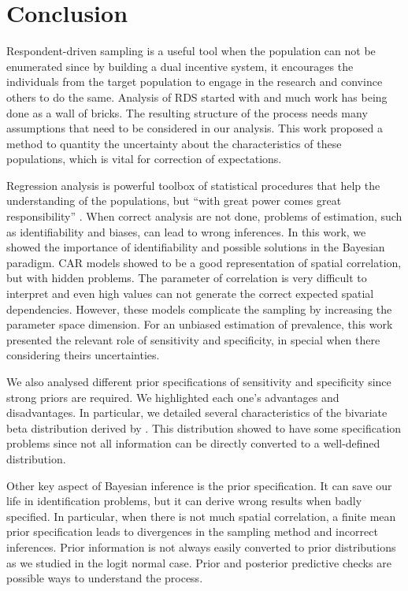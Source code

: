 \chapter{Conclusion}
\label{ch:conclusions}

Respondent-driven sampling is a useful tool when the population can not be
enumerated since by building a dual incentive system, it encourages the
individuals from the target population to engage in the research and convince
others to do the same. Analysis of RDS started with \textcite{heckathorn1997}
and much work has being done as a wall of bricks. The resulting structure of
the process needs many assumptions that need to be considered in our analysis.
This work proposed a method to quantity the uncertainty about the
characteristics of these populations, which is vital for correction of
expectations. 

Regression analysis is powerful toolbox of statistical procedures that help
the understanding of the populations, but ``with great power comes great
responsibility'' \cite[p. 13]{spider_man}. When correct analysis are not done,
problems of estimation, such as identifiability and biases, can lead to wrong
inferences. In this work, we showed the importance of identifiability and
possible solutions in the Bayesian paradigm. CAR models showed to be a good
representation of spatial correlation, but with hidden problems. The parameter of
correlation is very difficult to interpret and even high values can not
generate the correct expected spatial dependencies. However, these models
complicate the sampling by increasing the parameter space dimension. For an unbiased estimation of prevalence, this work presented the relevant 
role of sensitivity and specificity, in special when there considering theirs
uncertainties. 

We also analysed different prior specifications of sensitivity and specificity
since strong priors are required. We highlighted each one's advantages and
disadvantages. In particular, we detailed several characteristics of the
bivariate beta distribution derived by \textcite{olkin2015constructions}. This
distribution showed to have some specification problems since not all
information can be directly converted to a well-defined distribution. 

Other key aspect of Bayesian inference is the prior specification. It can save
our life in identification problems, but it can derive wrong results when
badly specified. In particular, when there is not much spatial correlation, a 
finite mean prior specification leads to divergences in the sampling method
and incorrect inferences. Prior information is not always easily converted to
prior distributions as we studied in the logit normal case. Prior and
posterior predictive checks are possible ways to understand the process. 

